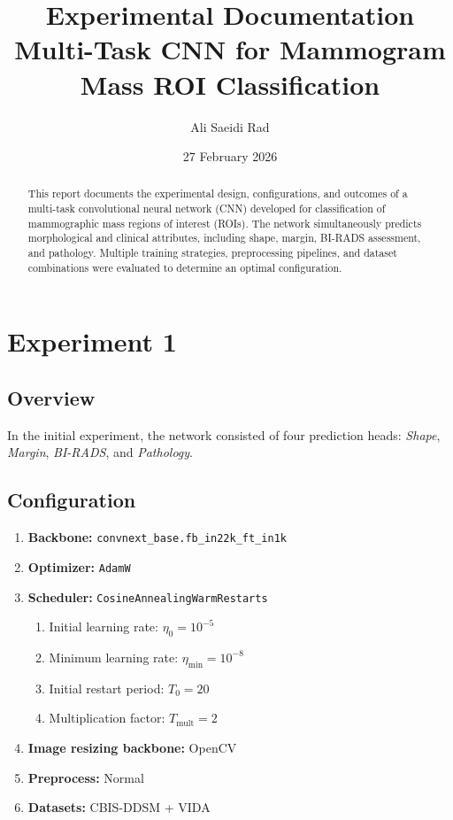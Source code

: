 \documentclass[11pt,a4paper]{article}
\title{\textbf{Experimental Documentation}\\
Multi-Task CNN for Mammogram Mass ROI Classification}
\author{Ali Saeidi Rad}
\date{27 February 2026}
\begin{document}
\maketitle

\begin{abstract}
This report documents the experimental design, configurations, and outcomes of a multi-task convolutional neural network (CNN) developed for classification of mammographic mass regions of interest (ROIs). The network simultaneously predicts morphological and clinical attributes, including shape, margin, BI-RADS assessment, and pathology. Multiple training strategies, preprocessing pipelines, and dataset combinations were evaluated to determine an optimal configuration.
\end{abstract}

\section{Experiment 1}

\subsection*{Overview}

In the initial experiment, the network consisted of four prediction heads:
\textit{Shape}, \textit{Margin}, \textit{BI-RADS}, and \textit{Pathology}.

\subsection*{Configuration}

\begin{enumerate}
    \item \textbf{Backbone:} \texttt{convnext\_base.fb\_in22k\_ft\_in1k}
    
    \item \textbf{Optimizer:} \texttt{AdamW}
    
    \item \textbf{Scheduler:} \texttt{CosineAnnealingWarmRestarts}
    \begin{enumerate}
        \item Initial learning rate: $\eta_{0} = 10^{-5}$
        \item Minimum learning rate: $\eta_{\min} = 10^{-8}$
        \item Initial restart period: $T_{0} = 20$
        \item Multiplication factor: $T_{\text{mult}} = 2$
    \end{enumerate}
    
    \item \textbf{Image resizing backbone:} OpenCV
    
    \item \textbf{Preprocess:} Normal
    
    \item \textbf{Datasets:} CBIS-DDSM + VIDA
\end{enumerate}
\end{document}
